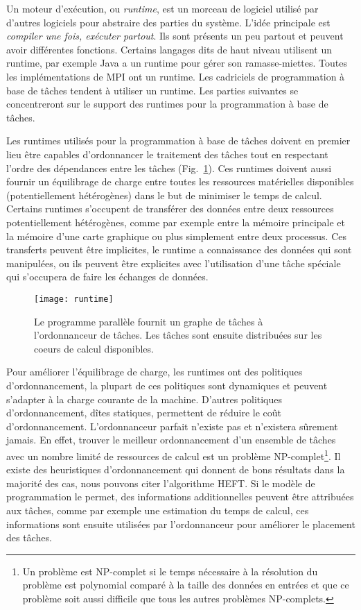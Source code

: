 Un moteur d'exécution, ou {\em runtime}, est un morceau de logiciel utilisé par d'autres logiciels pour abstraire des parties du système.
%
L'idée principale est {\em compiler une fois, exécuter partout}.
%
Ils sont présents un peu partout et peuvent avoir différentes fonctions.
%
Certains langages dits de haut niveau utilisent un runtime, par exemple Java a un runtime pour gérer son ramasse-miettes.
%
Toutes les implémentations de MPI ont un runtime.
%
Les cadriciels de programmation à base de tâches tendent à utiliser un runtime.
%
Les parties suivantes se concentreront sur le support des runtimes pour la programmation à base de tâches.

Les runtimes utilisés pour la programmation à base de tâches doivent en premier lieu être capables d'ordonnancer le traitement des tâches tout en respectant l'ordre des dépendances entre les tâches (Fig.~\ref{fig:runtime}).
%
Ces runtimes doivent aussi fournir un équilibrage de charge entre toutes les ressources matérielles disponibles (potentiellement hétérogènes) dans le but de minimiser le temps de calcul.
%
Certains runtimes s'occupent de transférer des données entre deux ressources potentiellement hétérogènes, comme par exemple entre la mémoire principale et la mémoire d'une carte graphique ou plus simplement entre deux processus.
%
Ces transferts peuvent être implicites, le runtime a connaissance des données qui sont manipulées, ou ils peuvent être explicites avec l'utilisation d'une tâche spéciale qui s'occupera de faire les échanges de données.
\begin{figure}
  \centering
  \texttt{[image: runtime]}
  \caption{Le programme parallèle fournit un graphe de tâches à l'ordonnanceur de tâches. Les tâches sont ensuite distribuées sur les coeurs de calcul disponibles.}
  \label{fig:runtime}
\end{figure}

Pour améliorer l'équilibrage de charge, les runtimes ont des politiques d'ordonnancement, la plupart de ces politiques sont dynamiques et peuvent s'adapter à la charge courante de la machine.
%
D'autres politiques d'ordonnancement, dîtes statiques, permettent de réduire le coût d'ordonnancement.
%
L'ordonnanceur parfait n'existe pas et n'existera sûrement jamais.
%
En effet, trouver le meilleur ordonnancement d'un ensemble de tâches avec un nombre limité de ressources de calcul est un problème NP-complet\footnote{Un problème est NP-complet si le temps nécessaire à la résolution du problème est polynomial comparé à la taille des données en entrées et que ce problème soit aussi difficile que tous les autres problèmes NP-complets.}.
%
Il existe des heuristiques d'ordonnancement qui donnent de bons résultats dans la majorité des cas, nous pouvons citer l'algorithme HEFT\cite{heft}.
%
Si le modèle de programmation le permet, des informations additionnelles peuvent être attribuées aux tâches, comme par exemple une estimation du temps de calcul, ces informations sont ensuite utilisées par l'ordonnanceur pour améliorer le placement des tâches.

